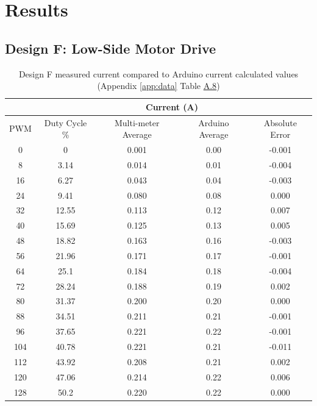 \section{Results}
\subsection{Design F: Low-Side Motor Drive}

\begin{table}[H]
    \centering
    \caption[Design F: Current Measurements]{Design F measured current compared to Arduino current calculated values (Appendix \ref{app:data} Table \hyperref[tab:A.8]{A.8})}
    \label{tab:Low_current}
    \begin{tabular}{|c|c||c|c||c|}\hline
     &&\multicolumn{2}{|c||}{Current (A)} &  \\\hline
    PWM &Duty Cycle \%&Multi-meter Average&Arduino Average&Absolute Error \\ \hline 
    0 &0&0.001&0.00&-0.001\\ \hline
    8 &3.14&0.014&0.01&-0.004\\\hline
    16 &6.27&0.043&0.04&-0.003\\\hline
    24 &9.41&0.080&0.08&0.000\\\hline
    32 &12.55&0.113&0.12&0.007\\\hline
    40 &15.69&0.125&0.13&0.005\\\hline
    48 &18.82& 0.163& 0.16& -0.003\\\hline
    56 &21.96& 0.171& 0.17& -0.001\\\hline
    64 &25.1& 0.184& 0.18& -0.004\\\hline
    72 &28.24& 0.188& 0.19& 0.002\\\hline
    80 &31.37& 0.200& 0.20& 0.000\\\hline
    88 &34.51& 0.211& 0.21& -0.001\\\hline
    96 &37.65& 0.221& 0.22& -0.001\\\hline
    104 &40.78& 0.221& 0.21& -0.011\\\hline
    112 &43.92& 0.208& 0.21& 0.002\\\hline
    120 &47.06& 0.214& 0.22& 0.006\\\hline
    128 &50.2& 0.220& 0.22& 0.000\\\hline\end{tabular}  
\end{table}

